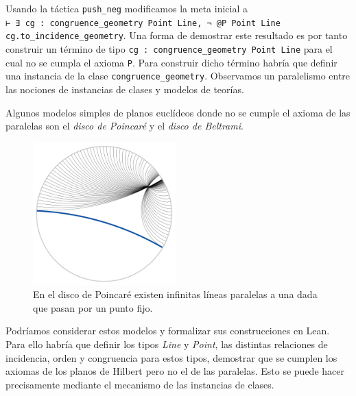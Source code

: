 
Usando la táctica \lstinline{push_neg} modificamos la meta inicial a\\
\lstinline{⊢ ∃ cg : congruence_geometry Point Line, ¬ @P Point Line cg.to_incidence_geometry}.
Una forma de demostrar este resultado es por tanto construir un término de
tipo \lstinline{cg : congruence_geometry Point Line} para el cual no se cumpla
el axioma \lstinline{P}.
Para construir dicho término habría que definir una instancia de la clase
\lstinline{congruence_geometry}. Observamos un paralelismo entre las nociones de
instancias de clases y modelos de teorías.

Algunos modelos simples de planos euclídeos donde no se cumple el axioma de las
paralelas son el \textit{disco de Poincaré} y el \textit{disco de Beltrami}.

\begin{figure}[htbp]
	\centerline{\includegraphics[width=5.5cm]{./imgs/Poincare_disc_hyperbolic_parallel_lines.png}}
	\caption*{En el disco de Poincaré existen infinitas líneas paralelas a una
		dada que pasan por un punto fijo.}
	\label{figure:poincare}
\end{figure}

Podríamos considerar estos modelos y formalizar sus construcciones en Lean.
Para ello habría que definir los tipos \textit{Line} y \textit{Point}, las
distintas relaciones de incidencia, orden y congruencia para estos tipos,
demostrar que se cumplen los axiomas de los planos de Hilbert pero no el de las
paralelas. Esto se puede hacer precisamente mediante el mecanismo de las
instancias de clases.



